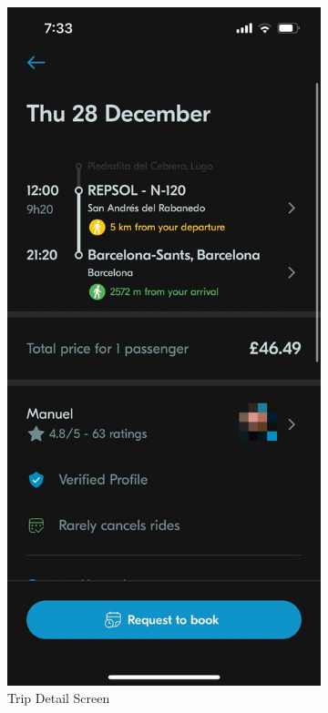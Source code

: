 \documentclass[a4paper, 12pt]{article} %
\begin{document}
\begin{figure}
\begin{subfigure}{0.3\textwidth}
                        \includegraphics[width=0.8\linewidth, height=0.9\textheight, keepaspectratio]{Images/Blablacar_trip_detail.png}  
                        \caption{Trip Detail Screen}
                        \label{fig:blabla_detail}
                    \end{subfigure}
                    \newline %
                    \newline
                    \begin{subfigure}{0.3\textwidth}

\end{subfigure}
\end{figure}
\end{document}
